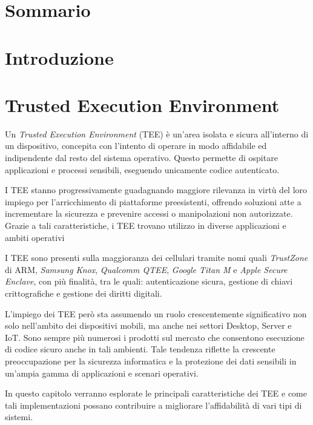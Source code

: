 \documentclass[12pt,italian]{report}
\begin{document}
	\frontespizio
	\afterpreface

	\chapter*{Sommario}
	\label{cap:sommario}
	
	\chapter{Introduzione}
	\label{sec:introduzione}
	
	\chapter{Trusted Execution Environment}
	\label{cap:TEE}
	Un \textit{Trusted Execution Environment} (TEE) è un'area isolata e sicura all'interno di un dispositivo, concepita con l'intento di operare in modo affidabile ed indipendente dal resto del sistema operativo. Questo permette di ospitare applicazioni e processi sensibili, eseguendo unicamente codice autenticato.
	
	I TEE stanno progressivamente guadagnando maggiore rilevanza in virtù del loro impiego per l'arricchimento di piattaforme preesistenti, offrendo soluzioni atte a incrementare la sicurezza e prevenire accessi o manipolazioni non autorizzate. Grazie a tali caratteristiche, i TEE trovano utilizzo in diverse applicazioni e ambiti operativi
	
	I TEE sono presenti sulla maggioranza dei cellulari tramite nomi quali \textit{TrustZone} di ARM, \textit{Samsung Knox}, \textit{Qualcomm QTEE}, \textit{Google Titan M} e \textit{Apple Secure Enclave}, con più finalità, tra le quali: autenticazione sicura, gestione di chiavi crittografiche e gestione dei diritti digitali.
	
	L'impiego dei TEE però sta assumendo un ruolo crescentemente significativo non solo nell'ambito dei dispositivi mobili, ma anche nei settori Desktop, Server e IoT. Sono sempre più numerosi i prodotti sul mercato che consentono esecuzione di codice sicuro anche in tali ambienti. Tale tendenza riflette la crescente preoccupazione per la sicurezza informatica e la protezione dei dati sensibili in un'ampia gamma di applicazioni e scenari operativi.
	
	In questo capitolo verranno esplorate le principali caratteristiche dei TEE e come tali implementazioni possano contribuire a migliorare l'affidabilità di vari tipi di sistemi.
	
\end{document}
